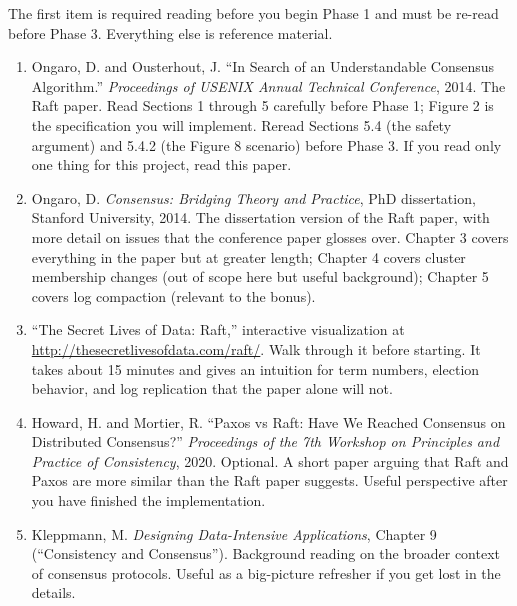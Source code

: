 \documentclass[11pt,a4paper]{article}
\begin{document}
The first item is required reading before you begin Phase 1 and must be re-read before Phase 3. Everything else is reference material.

\begin{enumerate}
\item Ongaro, D. and Ousterhout, J. ``In Search of an Understandable Consensus Algorithm.'' \textit{Proceedings of USENIX Annual Technical Conference}, 2014. The Raft paper. Read Sections 1 through 5 carefully before Phase 1; Figure 2 is the specification you will implement. Reread Sections 5.4 (the safety argument) and 5.4.2 (the Figure 8 scenario) before Phase 3. If you read only one thing for this project, read this paper.

\item Ongaro, D. \textit{Consensus: Bridging Theory and Practice}, PhD dissertation, Stanford University, 2014. The dissertation version of the Raft paper, with more detail on issues that the conference paper glosses over. Chapter 3 covers everything in the paper but at greater length; Chapter 4 covers cluster membership changes (out of scope here but useful background); Chapter 5 covers log compaction (relevant to the bonus).

\item ``The Secret Lives of Data: Raft,'' interactive visualization at \url{http://thesecretlivesofdata.com/raft/}. Walk through it before starting. It takes about 15 minutes and gives an intuition for term numbers, election behavior, and log replication that the paper alone will not.

\item Howard, H. and Mortier, R. ``Paxos vs Raft: Have We Reached Consensus on Distributed Consensus?'' \textit{Proceedings of the 7th Workshop on Principles and Practice of Consistency}, 2020. Optional. A short paper arguing that Raft and Paxos are more similar than the Raft paper suggests. Useful perspective after you have finished the implementation.

\item Kleppmann, M. \textit{Designing Data-Intensive Applications}, Chapter 9 (``Consistency and Consensus''). Background reading on the broader context of consensus protocols. Useful as a big-picture refresher if you get lost in the details.
\end{enumerate}

\footerboxes
\end{document}
